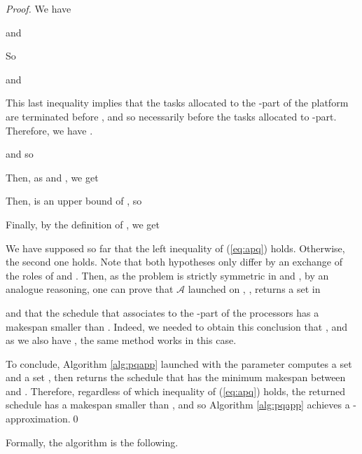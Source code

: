\documentclass{llncs}
\newcommand{\newparskip}{\bigskip}
\newcommand{\A}{\ensuremath{\mathcal A}\xspace}
\begin{document}
\begin{proof}
We have



and 



So



and 




This last inequality implies that the tasks allocated to the -part of the platform are terminated before , and so necessarily before the tasks allocated to -part. Therefore, we have .

and so


Then, as  and , we get



Then,  is an upper bound of , so



Finally, by the definition of , we get




\newparskip

We have supposed so far that the left inequality of (\ref{eq:apq}) holds. Otherwise, the second one holds. Note that both hypotheses only differ by an exchange of the roles of  and . Then, as the problem is strictly symmetric in  and , by an analogue reasoning, one can prove that \A launched on , ,  returns a set  in 



and that the schedule that associates  to the -part of the processors has a makespan smaller than . Indeed, we needed to obtain this conclusion that , and as we also have , the  same method works in this case.

\newparskip

To conclude, Algorithm \ref{alg:pqapp} launched with the parameter  computes a set  and a set , then returns the schedule that has the minimum makespan between  and . Therefore, regardless of which inequality of (\ref{eq:apq}) holds, the returned schedule has a makespan smaller than , and so Algorithm \ref{alg:pqapp} achieves a -approximation.\qed 
\end{proof}


Formally, the algorithm is the following.
\end{document}
